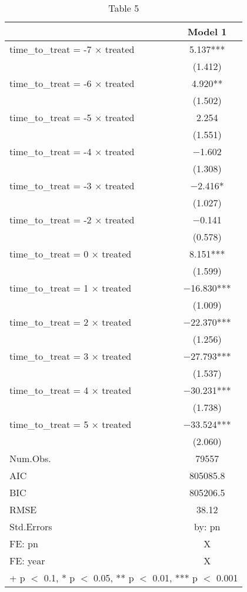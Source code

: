 \begin{table}

\caption{Table 5}
\centering
\begin{tabular}[t]{lc}
\toprule
  & Model 1\\
\midrule
time\_to\_treat = -7 × treated & \num{5.137}***\\
 & (\num{1.412})\\
time\_to\_treat = -6 × treated & \num{4.920}**\\
 & (\num{1.502})\\
time\_to\_treat = -5 × treated & \num{2.254}\\
 & (\num{1.551})\\
time\_to\_treat = -4 × treated & \num{-1.602}\\
 & (\num{1.308})\\
time\_to\_treat = -3 × treated & \num{-2.416}*\\
 & (\num{1.027})\\
time\_to\_treat = -2 × treated & \num{-0.141}\\
 & (\num{0.578})\\
time\_to\_treat = 0 × treated & \num{8.151}***\\
 & (\num{1.599})\\
time\_to\_treat = 1 × treated & \num{-16.830}***\\
 & (\num{1.009})\\
time\_to\_treat = 2 × treated & \num{-22.370}***\\
 & (\num{1.256})\\
time\_to\_treat = 3 × treated & \num{-27.793}***\\
 & (\num{1.537})\\
time\_to\_treat = 4 × treated & \num{-30.231}***\\
 & (\num{1.738})\\
time\_to\_treat = 5 × treated & \num{-33.524}***\\
 & (\num{2.060})\\
\midrule
Num.Obs. & \num{79557}\\
AIC & \num{805085.8}\\
BIC & \num{805206.5}\\
RMSE & \num{38.12}\\
Std.Errors & by: pn\\
FE: pn & X\\
FE: year & X\\
\bottomrule
\multicolumn{2}{l}{\rule{0pt}{1em}+ p $<$ 0.1, * p $<$ 0.05, ** p $<$ 0.01, *** p $<$ 0.001}\\
\end{tabular}
\end{table}

